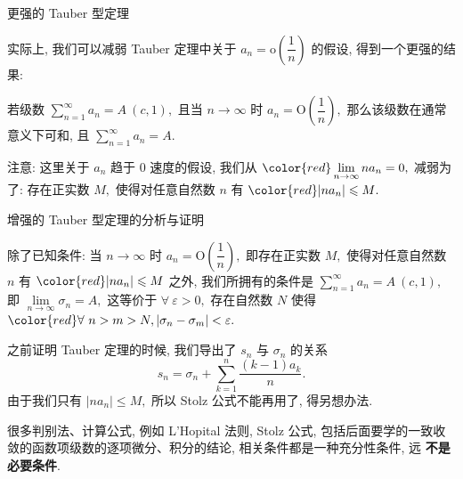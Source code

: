 
\begin{frame}{更强的 Tauber 型定理}

实际上, 我们可以减弱 Tauber 定理中关于 $a_n = \mathrm{o} \left( \dfrac{1}{n} \right)$ 的假设, 得到一个更强的结果:

\begin{thm}[Hardy]
若级数 $\sum\limits_{n=1}^{\infty} a_n = A~(c, 1),$ 且当 $n\to\infty$ 时 $a_n = \mathrm{O} \left( \dfrac{1}{n} \right),$ 那么该级数在通常意义下可和, 且 $\sum\limits_{n=1}^{\infty} a_n = A.$
\end{thm}

\vspace*{1em}

注意: 这里关于 $a_n$ 趋于 $0$ 速度的假设, 我们从 ${\color{red} \lim\limits_{n\to\infty} n a_n = 0},$ 减弱为了: 存在正实数 $M,$ 使得对任意自然数 $n$ 有 ${\color{red} \rvert n a_n \rvert \leqslant M}.$

\end{frame}


\begin{frame}{增强的 Tauber 型定理的分析与证明}

除了已知条件: 当 $n\to\infty$ 时 $a_n = \mathrm{O} \left( \dfrac{1}{n} \right),$ 即存在正实数 $M,$ 使得对任意自然数 $n$ 有 ${\color{red} \rvert n a_n \rvert \leqslant M}$ 之外, 我们所拥有的条件是 $\sum\limits_{n=1}^{\infty} a_n = A~(c, 1),$ 即 $\lim\limits_{n\to\infty} \sigma_n = A,$ 这等价于 $\forall~\varepsilon > 0,$ 存在自然数 $N$ 使得 ${\color{red} \forall~n > m > N, \lvert \sigma_n - \sigma_m \vert < \varepsilon}.$

\pause
\vspace*{0.4em}

之前证明 Tauber 定理的时候, 我们导出了 $s_n$ 与 $\sigma_n$ 的关系
\[s_n = \sigma_n + \sum\limits_{k = 1}^n \dfrac{(k-1)a_k}{n}.\]
由于我们只有 $\rvert n a_n \rvert \leqslant M,$ 所以 Stolz 公式不能再用了, 得另想办法.

\pause
\vspace*{0.4em}

\begin{attnblock}
很多判别法、计算公式, 例如 L'Hopital 法则, Stolz 公式, 包括后面要学的一致收敛的函数项级数的逐项微分、积分的结论, 相关条件都是一种充分性条件, 远 \textbf{\color{red}不是必要条件}.
\end{attnblock}

\end{frame}


